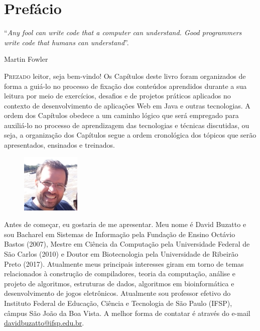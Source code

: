 \chapter*{Prefácio}
\epigraph{``\textit{Any fool can write code that a computer can understand. Good programmers write code that humans can understand}''.}{Martin Fowler}

\lettrine[lines=4, lhang=0.1, lraise=0, loversize=0.2, findent=0.1em]{\textcolor{corAzulTema}{P}}{rezado} leitor, seja bem-vindo! Os Capítulos deste livro foram organizados de forma a guiá-lo no processo de fixação dos conteúdos aprendidos durante a sua leitura por meio de exercícios, desafios e de projetos práticos aplicados no contexto de desenvolvimento de aplicações Web em Java e outras tecnologias. A ordem dos Capítulos obedece a um caminho lógico que será empregado para auxiliá-lo no processo de aprendizagem das tecnologias e técnicas discutidas, ou seja, a organização dos Capítulos segue a ordem cronológica dos tópicos que serão apresentados, ensinados e treinados.

\begin{figure}
    \centering
    \includegraphics[width=0.25\textwidth]{imagens/david}
\end{figure}

Antes de começar, eu gostaria de me apresentar. Meu nome é David Buzatto e sou Bacharel em Sistemas de Informação pela Fundação de Ensino Octávio Bastos (2007), Mestre em Ciência da Computação pela Universidade Federal de São Carlos (2010) e Doutor em Biotecnologia pela Universidade de Ribeirão Preto (2017). Atualmente meus principais interesses giram em torno de temas relacionados à construção de compiladores, teoria da computação, análise e projeto de algoritmos, estruturas de dados, algoritmos em bioinformática e desenvolvimento de jogos eletrônicos. Atualmente sou professor efetivo do Instituto Federal de Educação, Ciência e Tecnologia de São Paulo (IFSP), câmpus São João da Boa Vista. A melhor forma de contatar é através do e-mail \textcolor{corAzulTema}{\href{mailto:davidbuzatto@ifsp.edu.br}{davidbuzatto@ifsp.edu.br}}.

